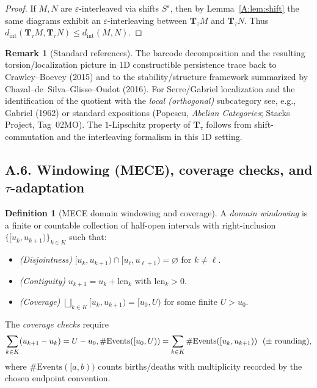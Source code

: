 \documentclass[11pt]{article}
\numberwithin{equation}{section}
\theoremstyle{plain}
\theoremstyle{definition}
\theoremstyle{remark}
\theoremstyle{plain}
\theoremstyle{definition}
\numberwithin{equation}{section}
\theoremstyle{definition}
\newtheorem{definition}[theorem]{Definition}
\newtheorem{remark}[theorem]{Remark}
\numberwithin{equation}{section}
\theoremstyle{plain}
\theoremstyle{definition}
\theoremstyle{remark}
\newcommand{\len}{\mathrm{len}}
\providecommand{\n}{\unskip\space}
\begin{document}
\begin{proof}
If \(M,N\) are \(\varepsilon\)-interleaved via shifts \(S^\varepsilon\), then by Lemma~\ref{A:lem:shift} the same diagrams exhibit an \(\varepsilon\)-interleaving between \(\mathbf{T}_\tau M\) and \(\mathbf{T}_\tau N\).
Thus \(d_{\mathrm{int}}(\mathbf{T}_\tau M,\mathbf{T}_\tau N)\le d_{\mathrm{int}}(M,N)\).
\end{proof}

\begin{remark}[Standard references]
The barcode decomposition and the resulting torsion/localization picture in 1D constructible persistence trace back to Crawley–Boevey (2015) and to the stability/structure framework summarized by Chazal–de~Silva–Glisse–Oudot (2016).
For Serre/Gabriel localization and the identification of the quotient with the \emph{local (orthogonal)} subcategory see, e.g., Gabriel (1962) or standard expositions (Popescu, \emph{Abelian Categories}; Stacks Project, Tag~02MO).
The \(1\)-Lipschitz property of \(\mathbf{T}_\tau\) follows from shift-commutation and the interleaving formalism in this 1D setting.
\end{remark}

\subsection*{A.6. Windowing (MECE), coverage checks, and \texorpdfstring{$\tau$}{tau}-adaptation}
\begin{definition}[MECE domain windowing and coverage]\label{A:def:MECE}
A \emph{domain windowing} is a finite or countable collection of half-open intervals with right-inclusion
\(\{[u_k,u_{k+1})\}_{k\in K}\) such that:
\begin{itemize}
  \item \emph{(Disjointness)} \([u_k,u_{k+1})\cap [u_\ell,u_{\ell+1})=\varnothing\) for \(k\neq \ell\).
  \item \emph{(Contiguity)} \(u_{k+1}=u_k+\len_k\) with \(\len_k>0\).
  \item \emph{(Coverage)} \(\bigsqcup_{k\in K}[u_k,u_{k+1})=[u_0,U)\) for some finite \(U>u_0\).
\end{itemize}
The \emph{coverage checks} require
\[
\sum_{k\in K}(u_{k+1}-u_k)=U-u_0,\n\qquad\n\#\mathrm{Events}([u_0,U))=\sum_{k\in K}\#\mathrm{Events}([u_k,u_{k+1}))\ \ (\pm\ \text{rounding}),
\]
where \(\#\mathrm{Events}([a,b))\) counts births/deaths with multiplicity recorded by the chosen endpoint convention.
\end{definition}
\end{document}
